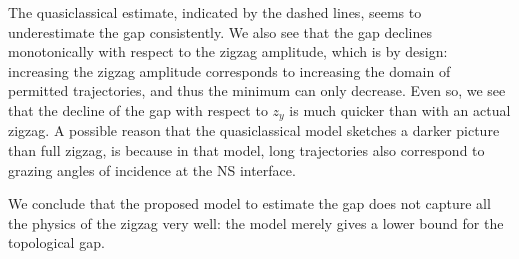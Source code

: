 			The quasiclassical estimate, indicated by the dashed lines, seems to underestimate the gap consistently.
			We also see that the gap declines monotonically with respect to the zigzag amplitude, which is by design: increasing the zigzag amplitude corresponds to increasing the domain of permitted trajectories, and thus the minimum can only decrease.
			Even so, we see that the decline of the gap with respect to $z_y$ is much quicker than with an actual zigzag.
			A possible reason that the quasiclassical model sketches a darker picture than full zigzag, is because in that model, long trajectories also correspond to grazing angles of incidence at the NS interface.

			We conclude that the proposed model to estimate the gap does not capture all the physics of the zigzag very well: the model merely gives a lower bound for the topological gap.
